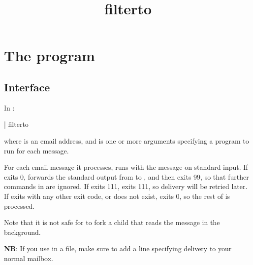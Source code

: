 \documentclass{book}
\title{filterto}
\begin{document}
\section{The  program}

\subsection{Interface}
In :
\begin{code}%
  | filterto  
\end{code}
where  is an email address, and  is one or
more arguments specifying a program to run for each message.

For each email message it processes,  runs 
with the message on standard input.  If  exits 0,
 forwards the standard output from  to
, and then exits 99, so that further commands in
 are ignored.  If  exits 111, 
exits 111, so delivery will be retried later.  If  exits
with any other exit code, or does not exist,  exits 0,
so the rest of  is processed.

Note that it is not safe for  to fork a child that reads
the message in the background.

\textbf{NB}: If you use  in a  file, make
sure to add a line specifying delivery to your normal mailbox.
\end{document}
